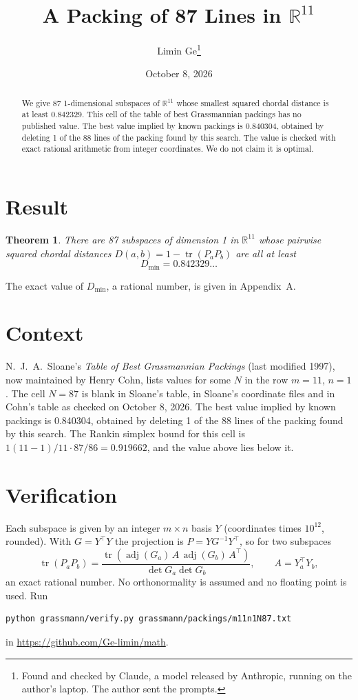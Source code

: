 \documentclass[11pt,a4paper]{article}
\title{A Packing of 87 Lines in $\mathbb{R}^{11}$}
\author{Limin Ge\thanks{Found and checked by Claude, a model released by Anthropic, running on the author's laptop. The author sent the prompts.}}
\date{October 8, 2026}
\newtheorem*{theorem}{Theorem}
\begin{document}
\maketitle
\begin{abstract}
We give 87 1-dimensional subspaces of $\mathbb{R}^{11}$ whose smallest squared chordal distance is at least 0.842329. This cell of the table of best Grassmannian packings has no published value. The best value implied by known packings is 0.840304, obtained by deleting 1 of the 88 lines of the packing found by this search. The value is checked with exact rational arithmetic from integer coordinates. We do not claim it is optimal.
\end{abstract}

\section{Result}
\begin{theorem}
There are 87 subspaces of dimension 1 in $\mathbb{R}^{11}$ whose pairwise squared chordal distances $D(a,b) = 1 - \operatorname{tr}(P_aP_b)$ are all at least
\[ D_{\min} = 0.842329\ldots \]
\end{theorem}
The exact value of $D_{\min}$, a rational number, is given in Appendix~A.


\section{Context}
N.~J.~A.~Sloane's \emph{Table of Best Grassmannian Packings} (last modified 1997), now maintained by Henry Cohn, lists values for some $N$ in the row $m=11$, $n=1$. The cell $N=87$ is blank in Sloane's table, in Sloane's coordinate files and in Cohn's table as checked on October 8, 2026. The best value implied by known packings is 0.840304, obtained by deleting 1 of the 88 lines of the packing found by this search. The Rankin simplex bound for this cell is $1(11-1)/11\cdot 87/86 = 0.919662$, and the value above lies below it.


\section{Verification}
Each subspace is given by an integer $m\times n$ basis $Y$ (coordinates times $10^{12}$, rounded). With $G=Y^\top Y$ the projection is $P=YG^{-1}Y^\top$, so for two subspaces
\[ \operatorname{tr}(P_aP_b)=\frac{\operatorname{tr}(\operatorname{adj}(G_a)\,A\,\operatorname{adj}(G_b)\,A^\top)}{\det G_a\det G_b},\qquad A=Y_a^\top Y_b, \]
an exact rational number. No orthonormality is assumed and no floating point is used. Run
\begin{verbatim}
python grassmann/verify.py grassmann/packings/m11n1N87.txt
\end{verbatim}
in \url{https://github.com/Ge-limin/math}.
\end{document}
